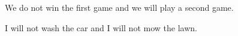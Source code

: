 \begin{list}{}
\item \begin{list}{\bf{(d)}}
\item We do not win the first game and we will play a second game.
\end{list}
\end{list}

\begin{list}{}
\item \begin{list}{\bf{(e)}}
\item I will not wash the car and I will not mow the lawn.
\end{list}
\end{list}


%
%


